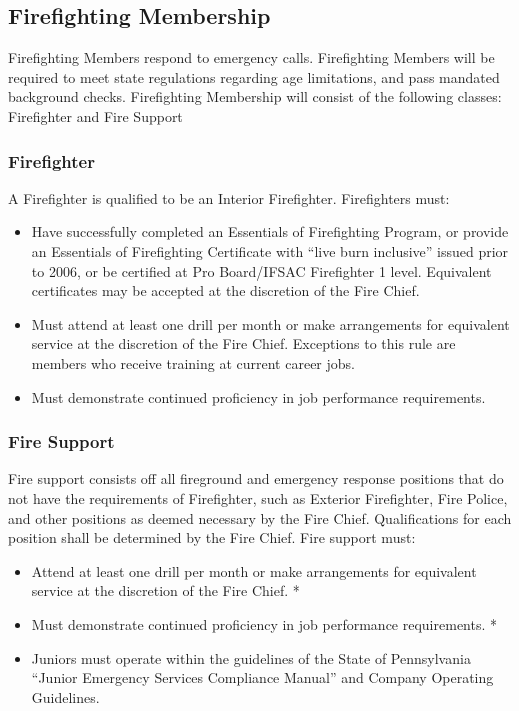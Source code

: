 ﻿\documentclass[12pt,letterpaper]{article}
\begin{document}
\subsection{Firefighting Membership}
Firefighting Members respond to emergency calls.  Firefighting Members will be required to meet state regulations regarding age limitations, and pass mandated background checks.  Firefighting Membership will consist of the following classes: Firefighter and Fire Support

\subsubsection{Firefighter}
A Firefighter is qualified to be an Interior Firefighter.  Firefighters must:
\begin{itemize}
\item Have successfully completed an Essentials of Firefighting Program, or provide an Essentials of Firefighting Certificate with “live burn inclusive” issued prior to 2006, or be certified at Pro Board/IFSAC Firefighter 1 level.  Equivalent certificates may be accepted at the discretion of the Fire Chief.
\item Must attend at least one drill per month or make arrangements for equivalent service at the discretion of the Fire Chief.  Exceptions to this rule are members who receive training at current career jobs.
\item Must demonstrate continued proficiency in job performance requirements.
\end{itemize}

\subsubsection{Fire Support}
Fire support consists off all fireground and emergency response positions that do not have the requirements of Firefighter, such as Exterior Firefighter, Fire Police, and other positions as deemed necessary by the Fire Chief.  Qualifications for each position shall be determined by the Fire Chief.  Fire support must:
\begin{itemize}
\item Attend at least one drill per month or make arrangements for equivalent service at the discretion of the Fire Chief.
*\item Must demonstrate continued proficiency in job performance requirements.
*\item Juniors must operate within the guidelines of the State of Pennsylvania “Junior Emergency Services Compliance Manual” and Company Operating Guidelines.
\end{itemize}
\end{document}

